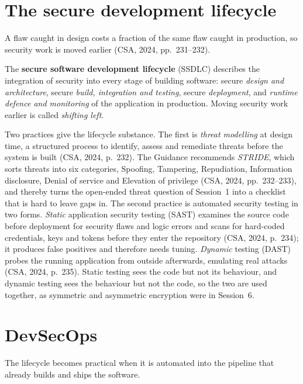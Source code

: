 \section{The secure development lifecycle}

A flaw caught in design costs a fraction of the same flaw caught in
production, so security work is moved earlier (CSA, 2024, pp.~231--232).

\begin{definition}\label{def:ssdlc}
The \textbf{secure software development lifecycle} (SSDLC) describes the
integration of security into every stage of building software: secure
\emph{design and architecture}, secure \emph{build, integration and testing},
secure \emph{deployment}, and \emph{runtime defence and monitoring} of the
application in production. Moving security work earlier is called
\emph{shifting left}.
\end{definition}

Two practices give the lifecycle substance. The first is \emph{threat
modelling} at design time, a structured process to identify, assess and
remediate threats before the system is built (CSA, 2024, p.~232). The
Guidance recommends \emph{STRIDE}, which sorts threats into six categories,
Spoofing, Tampering, Repudiation, Information disclosure, Denial of service
and Elevation of privilege (CSA, 2024, pp.~232--233), and thereby turns the
open-ended threat question of Session~1 into a checklist that is hard to
leave gaps in. The second practice is automated security testing in two
forms. \emph{Static} application security testing (SAST) examines the source
code before deployment for security flaws and logic errors and scans for
hard-coded credentials, keys and tokens before they enter the repository
(CSA, 2024, p.~234); it produces false positives and therefore needs
tuning. \emph{Dynamic} testing (DAST) probes the running application from
outside afterwards, emulating real attacks (CSA, 2024, p.~235). Static
testing sees the code but not its behaviour, and dynamic testing sees the
behaviour but not the code, so the two are used together, as symmetric and
asymmetric encryption were in Session~6.

\section{DevSecOps}

The lifecycle becomes practical when it is automated into the pipeline that
already builds and ships the software.

